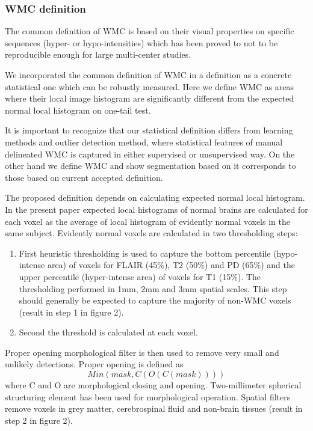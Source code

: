 \subsubsection{WMC definition}
The common definition of WMC is based on their visual properties on specific sequences (hyper- or hypo-intensities) which has been proved to not to be reproducible enough for large multi-center studies. 
\par
We incorporated the common definition of WMC in a definition as a concrete statistical one which can be robustly measured. Here we  define WMC as areas where their local image histogram are significantly different from the expected normal local histogram on one-tail test.
\par
It is important to recognize that our statistical definition differs from learning methods and outlier detection method, where statistical features of manual delineated WMC is captured in either supervised or unsupervised way.
On the other hand we define WMC and show segmentation based on it corresponds to those based on current accepted definition.
\par
The proposed definition depends on calculating expected normal local histogram. In the present paper expected local histograms of normal brains are calculated for each voxel as the average of local histogram of evidently normal voxels in the same subject. Evidently normal voxels are calculated in two thresholding steps:
\begin{enumerate}
\item First heuristic thresholding is used to capture the bottom percentile (hypo-intense area) of voxels for FLAIR (45\%), T2 (50\%) and PD (65\%) and the upper percentile (hyper-intense area) of voxels for T1 (15\%). The thresholding performed in 1mm, 2mm and 3mm spatial scales. This step should generally be expected to capture the majority of non-WMC voxels (result in step 1 in figure 2).
\item Second the threshold is calculated  \cite{ReduceSVM} at each voxel.
\end{enumerate}

Proper opening morphological filter is then used to remove very small and unlikely detections. Proper opening is defined as $$Min(mask,C( O( C( mask )))  )$$ where C and O are morphological closing and opening. Two-millimeter spherical structuring element has been used for morphological operation. Spatial filters remove voxels in grey matter, cerebrospinal fluid and non-brain tissues (result in step 2 in figure 2).

    
    
    
    
    
    
    
    
    
  
  